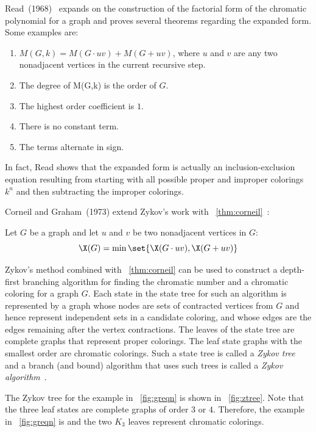 Read~(1968)~\cite{read} expands on the construction of the factorial form of the chromatic polynomial for a graph
and proves several theorems regarding the expanded form.  Some examples are:
\begin{enumerate}
\item \(M(G,k)=M(G\cdot uv)+M(G+uv)\), where \(u\) and \(v\) are any two nonadjacent vertices in the current
  recursive step.
\item The degree of M(G,k) is the order of \(G\).
\item The highest order coefficient is \(1\).
\item There is no constant term.
\item The terms alternate in sign.
\end{enumerate}
In fact, Read shows that the expanded form is actually an inclusion-exclusion equation resulting from starting with
all possible proper and improper colorings \(k^n\) and then subtracting the improper colorings.

Corneil and Graham~(1973) extend Zykov's work with \theoremname~\ref{thm:corneil}~\cite{corneil}:

\begin{theorem}
  \label{thm:corneil}
  Let \(G\) be a graph and let \(u\) and \(v\) be two nonadjacent vertices in \(G\):
  \[\X(G)=\min\set{\X(G\cdot uv),\X(G+uv)}\]
\end{theorem}

Zykov's method combined with \theoremname~\ref{thm:corneil} can be used to construct a depth-first branching
algorithm for finding the chromatic number and a chromatic coloring for a graph \(G\).  Each state in the state
tree for such an algorithm is represented by a graph whose nodes are sets of contracted vertices from \(G\) and
hence represent independent sets in a candidate coloring, and whose edges are the edges remaining after the vertex
contractions.  The leaves of the state tree are complete graphs that represent proper colorings.  The leaf state
graphs with the smallest order are chromatic colorings.  Such a state tree is called a \emph{Zykov tree} and a
branch (and bound) algorithm that uses such trees is called a \emph{Zykov algorithm}~\cite{corneil}.

The Zykov tree for the example in \figurename~\ref{fig:greqn} is shown in \figurename~\ref{fig:ztree}.  Note that
the three leaf states are complete graphs of order \(3\) or \(4\).  Therefore, the example in
\figurename~\ref{fig:greqn} is  and the two \(K_3\) leaves represent chromatic colorings.

